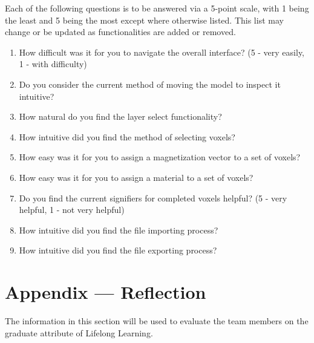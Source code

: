 \documentclass[12pt, titlepage]{article}
\begin{document}
\iffalse
\wss{This is a section that would be appropriate for some projects.}
\fi

Each of the following questions is to be answered via a 5-point scale, with 1 being the least and 5 being 
the most except where otherwise listed.
This list may change or be updated as functionalities are added or removed.

\begin{enumerate}
  \item How difficult was it for you to navigate the overall interface? (5 - very easily, 1 - with difficulty)
  \item Do you consider the current method of moving the model to inspect it intuitive?
  \item How natural do you find the layer select functionality?
  \item How intuitive did you find the method of selecting voxels?
  \item How easy was it for you to assign a magnetization vector to a set of voxels?
  \item How easy was it for you to assign a material to a set of voxels?
  \item Do you find the current signifiers for completed voxels helpful? (5 - very helpful, 1 - not very helpful)
  \item How intuitive did you find the file importing process?
  \item How intuitive did you find the file exporting process?
\end{enumerate}

\newpage{}
\section*{Appendix --- Reflection}

\iffalse
\wss{This section is not required for CAS 741}
\fi

The information in this section will be used to evaluate the team members on the
graduate attribute of Lifelong Learning.


\end{document}

